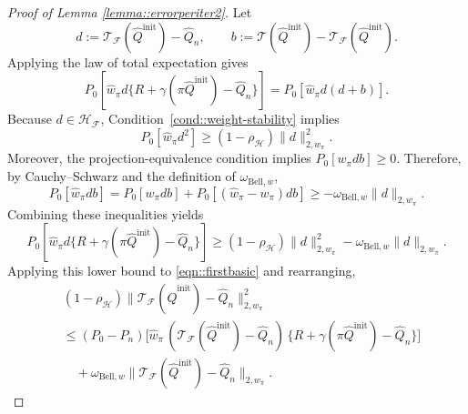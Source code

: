 \documentclass{article}
\theoremstyle{plain}
\theoremstyle{definition}
\theoremstyle{remark}
\begin{document}
\begin{proof}[Proof of Lemma \ref{lemma::errorperiter2}]
Let
\[
d:=\mathcal T_{\mathcal F}(\hat Q^{\mathrm{init}})-\hat Q_n,
\qquad
b:=\mathcal T(\hat Q^{\mathrm{init}})
-\mathcal T_{\mathcal F}(\hat Q^{\mathrm{init}}).
\]
Applying the law of total expectation gives
\[
P_0\!\left[
   \hat w_\pi d
   \{R+\gamma(\pi\hat Q^{\mathrm{init}})-\hat Q_n\}
\right]
=
P_0[\hat w_\pi d(d+b)].
\]
Because \(d\in\mathcal H_{\mathcal F}\), Condition~\ref{cond::weight-stability}
implies
\[
P_0[\hat w_\pi d^2]
\ge
(1-\rho_{\mathcal H})\|d\|_{2,w_\pi}^2.
\]
Moreover, the projection-equivalence condition implies
\(P_0[w_\pi d b]\ge0\). Therefore, by Cauchy--Schwarz and the definition of
\(\omega_{\mathrm{Bell},w}\),
\[
P_0[\hat w_\pi d b]
=
P_0[w_\pi d b]
+
P_0[(\hat w_\pi-w_\pi)d b]
\ge
-
\omega_{\mathrm{Bell},w}
\|d\|_{2,w_\pi}.
\]
Combining these inequalities yields
\[
P_0\!\left[
   \hat w_\pi d
   \{R+\gamma(\pi\hat Q^{\mathrm{init}})-\hat Q_n\}
\right]
\ge
(1-\rho_{\mathcal H})\|d\|_{2,w_\pi}^2
-
\omega_{\mathrm{Bell},w}
\|d\|_{2,w_\pi}.
\]
Applying this lower bound to \eqref{eqn::firstbasic} and rearranging,
\begin{equation}
\label{eqn::secondbasic}
\begin{aligned}
&(1-\rho_{\mathcal H})
\|\mathcal{T}_{\mathcal{F}}(\hat{Q}^{\mathrm{init}}) - \hat{Q}_n\|_{2,w_{\pi}}^2
\\
&\le
(P_0 - P_n)\big[
   \hat{w}_{\pi}\,
   (\mathcal{T}_{\mathcal{F}}(\hat{Q}^{\mathrm{init}}) - \hat{Q}_n)\,
   \{R + \gamma(\pi \hat{Q}^{\mathrm{init}}) - \hat{Q}_n\}
\big]
\\
&\quad+
\omega_{\mathrm{Bell},w}
\big\|
      \mathcal{T}_{\mathcal{F}}(\hat{Q}^{\mathrm{init}}) - \hat{Q}_n
   \big\|_{2,w_{\pi}}.
\end{aligned}
\end{equation}


\end{proof}
\end{document}
